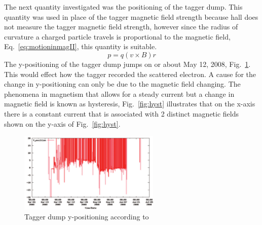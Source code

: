 The next quantity investigated was the positioning of the tagger dump. This quantity was used in place of the tagger magnetic field strength because hall  does not measure the tagger magnetic field strength, however since the radius of curvature a charged particle travels is proportional to the magnetic field, Eq.~\ref{eq:motioninmagII}, this quantity is suitable.
\begin{equation}\label{eq:motioninmagII}
    p = q(v \times B)r
\end{equation}
The y-positioning of the tagger dump jumps on or about May 12, 2008, Fig.~\ref{fig:tagdump}. This would effect how the tagger recorded the scattered electron. A cause for the change in y-positioning can only be due to the magnetic field changing. The phenomena in magnetism that allows for a steady current but a change in magnetic field is known as hysteresis, Fig.~\ref{fig:hyst} illustrates that on the x-axis there is a constant current that is associated with 2 distinct magnetic fields shown on the y-axis of Fig.~\ref{fig:hyst}.
\begin{figure}\begin{center}
\includegraphics[width=0.6\textwidth]{figures/calib/tag/ecor/600px-Tagger-dump-y.pdf}
\caption[Tagger Dump Y-Positioning]{\label{fig:tagdump}Tagger dump y-positioning according to }
\end{center}\end{figure}

